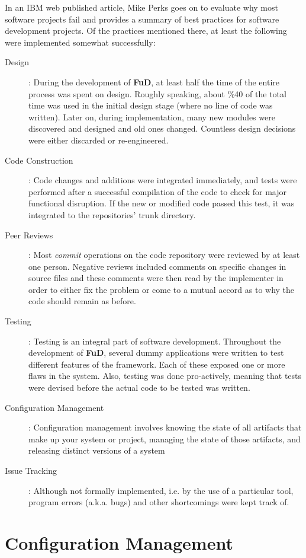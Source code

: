 \documentclass[a4paper,12pt,english]{report}
\newcommand{\fud}{\textbf{FuD}}
\begin{document}
In an IBM web published article\cite{softwarepractices}, Mike Perks goes on to evaluate why most software projects fail and provides a summary of best practices for software development projects. Of the practices mentioned there, at least the following were implemented somewhat successfully:
\begin{description}
\item[Design]: During the development of \fud, at least half the time of the entire process was spent on design. Roughly speaking, about \%40 of the total time was used in the initial design stage (where no line of code was written). Later on, during implementation, many new modules were discovered and designed and old ones changed. Countless design decisions were either discarded or re-engineered.
\item[Code Construction]: Code changes and additions were integrated immediately, and tests were performed after a successful compilation of the code to check for major functional disruption. If the new or modified code passed this test, it was integrated to the repositories' trunk directory.
\item[Peer Reviews]: Most \emph{commit} operations on the code repository were reviewed by at least one person. Negative reviews included comments on specific changes in source files and these comments were then read by the implementer in order to either fix the problem or come to a mutual accord as to why the code should remain as before.
\item[Testing]: Testing is an integral part of software development. Throughout the development of \fud, several dummy applications were written to test different features of the framework. Each of these exposed one or more flaws in the system. Also, testing was done pro-actively, meaning that tests were devised before the actual code to be tested was written.
\item[Configuration Management]: Configuration management involves knowing the state of all artifacts that make up your system or project, managing the state of those artifacts, and releasing distinct versions of a system
\item[Issue Tracking]: Although not formally implemented, i.e. by the use of a particular tool, program errors (a.k.a. bugs) and other shortcomings were kept track of.
\end{description}

\section{Configuration Management}
\end{document}
